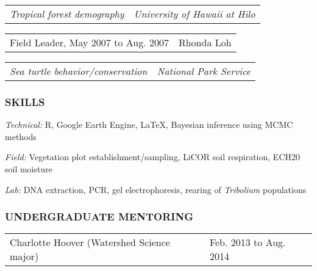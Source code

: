 \documentclass[11pt,english]{article}
\providecommand{\tabularnewline}{\\}
\begin{document}
\begin{tabular}{>{\raggedright}p{3.25in}>{\raggedleft}p{2.75in}}
\hspace{1.5em}\emph{Tropical forest demography} & \emph{University of Hawaii at Hilo}\tabularnewline
\end{tabular}
\vspace{-2ex}

\begin{tabular}{>{\raggedright}p{3in}>{\raggedleft}p{3in}}
Field Leader, May 2007 to Aug. 2007 & Rhonda Loh\tabularnewline
\end{tabular}

\begin{tabular}{>{\raggedright}p{3in}>{\raggedleft}p{3in}}
\hspace{1.5em}\emph{Sea turtle behavior/conservation} & \emph{National Park Service}
\end{tabular}


\subsubsection*{SKILLS}
\vspace{-0.5ex}

\begin{hangparas}{0.25in}{1}
\hspace{0.575em}\emph{Technical:} R, Google Earth Engine, \LaTeX{}, Bayesian inference using MCMC methods

\hspace{0.575em}\emph{Field:} Vegetation plot establishment/sampling, LiCOR soil respiration, ECH20 soil moisture 

\hspace{0.575em}\emph{Lab:} DNA extraction, PCR, gel electrophoresis, rearing of \emph{Tribolium} populations

\end{hangparas}
\vspace{1ex}


\subsubsection*{UNDERGRADUATE MENTORING}
\vspace{-0.5ex}

\begin{tabular}{>{\raggedright}p{4in}>{\raggedleft}p{2in}}
Charlotte Hoover (Watershed Science major) & Feb. 2013 to Aug. 2014 \tabularnewline
\end{tabular}
\end{document}
